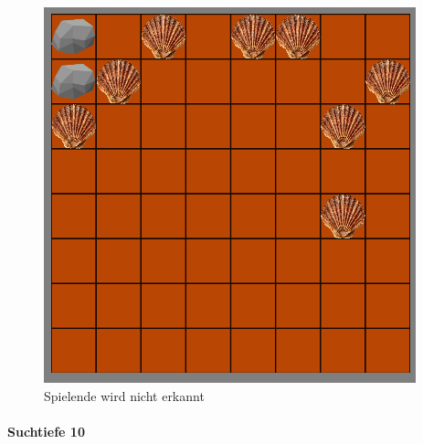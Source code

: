 \begin{figure}[h]
	\centering
	\includegraphics{img/tiefe3Hide/einkesselnHidezuhoch}
	\caption{Spielende wird nicht erkannt}
	\label{fig:nicht erkannt}
\end{figure}

\paragraph{Suchtiefe 10}


